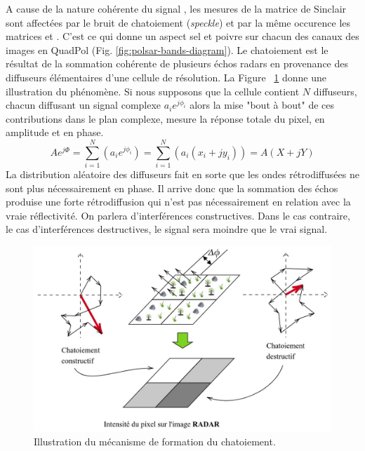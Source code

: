 A cause de la nature cohérente du signal \acrsarns, les mesures de la matrice de Sinclair sont affectées par le bruit de chatoiement (\textit{speckle}) et par la même occurence les matrices \matcoh et \matcov.  C'est ce qui donne un aspect sel et poivre sur chacun des canaux des images en QuadPol (Fig. \ref{fig:polsar-bands-diagram}).  Le chatoiement est le résultat de la sommation cohérente de plusieurs échos radars en provenance des diffuseurs élémentaires d’une cellule de résolution. La Figure ~\ref{fig:speckle-diagram} donne une illustration du phénomène. Si nous supposons que la cellule contient $N$ diffuseurs, chacun diffusant un signal complexe $a_i e^{j\phi_i}$ alors la
mise "bout à bout" de ces contributions dans le plan complexe, mesure la réponse
totale du pixel, en amplitude et en phase.
\begin{equation}
A e^{j\Phi} = \sum_{i=1}^{N}(a_i e^{j\phi_i}) = \sum_{i=1}^{N}(a_i (x_i+jy_i)) = A(X+jY)
\end{equation}
La distribution aléatoire des diffuseurs fait en sorte que les ondes rétrodiffusées ne sont plus nécessairement en phase. Il arrive donc que la sommation des échos produise une forte rétrodiffusion qui n'est pas nécessairement en relation avec la vraie réflectivité. On parlera d’interférences constructives.  Dans le cas contraire, le cas d’interférences destructives, le signal sera moindre que le vrai signal.


\begin{figure}[!htbp] 
  \includegraphics[width=1.0 \linewidth]{figures/speckle-diagram.jpg}
   \centering
        \caption
        {\small Illustration du mécanisme de formation du chatoiement.}
  \label{fig:speckle-diagram}
\end{figure}

